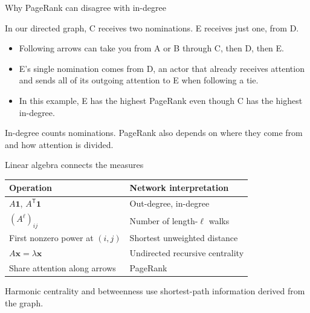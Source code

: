 \documentclass[aspectratio=169,11pt]{beamer}
\newcommand{\ones}{\mathbf{1}}
\begin{document}
\begin{frame}{Why PageRank can disagree with in-degree}

In our directed graph, C receives two nominations. E receives just one, from D.
\begin{itemize}
\item Following arrows can take you from A or B through C, then D, then E.
\medskip\item E's single nomination comes from D, an actor that already receives attention and sends all of its outgoing attention to E when following a tie.
\medskip\item In this example, E has the highest PageRank even though C has the highest in-degree.
\end{itemize}
\textcolor{accent}{In-degree counts nominations. PageRank also depends on where they come from and how attention is divided.}

\end{frame}

\begin{frame}{Linear algebra connects the measures}

\begin{center}\begin{tabular}{ll}
\toprule
Operation & Network interpretation\\\midrule
$A\ones$, $A^{\mathsf T}\ones$ & Out-degree, in-degree\\
$(A^\ell)_{ij}$ & Number of length-$\ell$ walks\\
First nonzero power at $(i,j)$ & Shortest unweighted distance\\
$A\mathbf{x}=\lambda\mathbf{x}$ & Undirected recursive centrality\\
Share attention along arrows & PageRank\\\bottomrule
\end{tabular}\end{center}
Harmonic centrality and betweenness use shortest-path information derived from the graph.


\end{frame}
\end{document}
